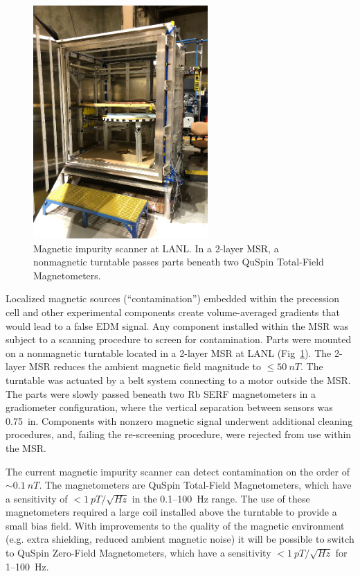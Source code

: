 \begin{figure}
    \centering
    \includegraphics[height=3.5in]{figures/magnetic_impurity_scanner.png}
    \caption
      {Magnetic impurity scanner at LANL. In a 2-layer MSR, a nonmagnetic turntable passes parts beneath two QuSpin Total-Field Magnetometers.}
    \label{fig:magnetic_impurity_scanner}
\end{figure}

Localized magnetic sources (``contamination'') embedded within the precession cell and other experimental components create volume-averaged gradients that would lead to a false EDM signal. Any component installed within the MSR was subject to a scanning procedure to screen for contamination. Parts were mounted on a nonmagnetic turntable located in a 2-layer MSR at LANL (Fig~\ref{fig:magnetic_impurity_scanner}). The 2-layer MSR reduces the ambient magnetic field magnitude to $\leq \qty{50}{nT}$. The turntable was actuated by a belt system connecting to a motor outside the MSR. The parts were slowly passed beneath two Rb SERF magnetometers in a gradiometer configuration, where the vertical separation between sensors was \qty{0.75}{in}. Components with nonzero magnetic signal underwent additional cleaning procedures, and, failing the re-screening procedure, were rejected from use within the MSR.

The current magnetic impurity scanner can detect contamination on the order of $\sim\qty{0.1}{nT}$. The magnetometers are QuSpin Total-Field Magnetometers, which have a sensitivity of $<\qty{1}{pT\per\sqrt{Hz}}$ in the 0.1--\qty{100}{\hertz} range. The use of these magnetometers required a large coil installed above the turntable to provide a small bias field. With improvements to the quality of the magnetic environment (e.g. extra shielding, reduced ambient magnetic noise) it will be possible to switch to QuSpin Zero-Field Magnetometers, which have a sensitivity $<\qty{1}{pT\per\sqrt{Hz}}$ for 1--\qty{100}{\hertz}.

